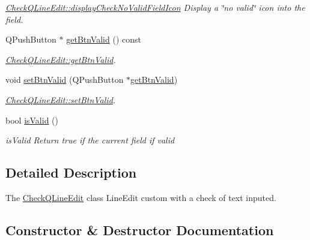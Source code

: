 \begin{DoxyCompactItemize}
\begin{DoxyCompactList}\small\item\em \hyperlink{classGui_1_1Widgets_1_1CheckFields_1_1CheckQLineEdit_a0c35fee8c76e651163e71ddaac04dc97}{Check\+Q\+Line\+Edit\+::display\+Check\+No\+Valid\+Field\+Icon} Display a \char`\"{}no valid\char`\"{} icon into the field. \end{DoxyCompactList}\item 
Q\+Push\+Button $\ast$ \hyperlink{classGui_1_1Widgets_1_1CheckFields_1_1CheckQLineEdit_a0fd99ca76208b4986c6165b9ef1c04e3}{get\+Btn\+Valid} () const 
\begin{DoxyCompactList}\small\item\em \hyperlink{classGui_1_1Widgets_1_1CheckFields_1_1CheckQLineEdit_a0fd99ca76208b4986c6165b9ef1c04e3}{Check\+Q\+Line\+Edit\+::get\+Btn\+Valid}. \end{DoxyCompactList}\item 
void \hyperlink{classGui_1_1Widgets_1_1CheckFields_1_1CheckQLineEdit_aa5f2ef2358512cf6e7d2eb4af58deb8d}{set\+Btn\+Valid} (Q\+Push\+Button $\ast$\hyperlink{classGui_1_1Widgets_1_1CheckFields_1_1CheckQLineEdit_a0fd99ca76208b4986c6165b9ef1c04e3}{get\+Btn\+Valid})
\begin{DoxyCompactList}\small\item\em \hyperlink{classGui_1_1Widgets_1_1CheckFields_1_1CheckQLineEdit_aa5f2ef2358512cf6e7d2eb4af58deb8d}{Check\+Q\+Line\+Edit\+::set\+Btn\+Valid}. \end{DoxyCompactList}\item 
bool \hyperlink{classGui_1_1Widgets_1_1CheckFields_1_1CheckQLineEdit_a468dcf5d39993973ee4c891658baba18}{is\+Valid} ()
\begin{DoxyCompactList}\small\item\em is\+Valid Return true if the current field if valid \end{DoxyCompactList}\end{DoxyCompactItemize}


\subsection{Detailed Description}
The \hyperlink{classGui_1_1Widgets_1_1CheckFields_1_1CheckQLineEdit}{Check\+Q\+Line\+Edit} class Line\+Edit custom with a check of text inputed. 

\subsection{Constructor \& Destructor Documentation}
\hypertarget{classGui_1_1Widgets_1_1CheckFields_1_1CheckQLineEdit_a354342ac8c875603552dfd894c5322b8}{}

